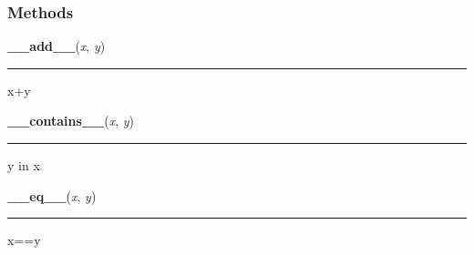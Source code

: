 
  \subsubsection{Methods}

    \label{posix:stat_result:__add__}

    \vspace{0.5ex}

\hspace{.8\funcindent}\begin{boxedminipage}{\funcwidth}

    \raggedright \textbf{\_\_add\_\_}(\textit{x}, \textit{y})

    \vspace{-1.5ex}

    \rule{\textwidth}{0.5\fboxrule}
\setlength{\parskip}{2ex}
    x+y

\setlength{\parskip}{1ex}
    \end{boxedminipage}

    \label{posix:stat_result:__contains__}

    \vspace{0.5ex}

\hspace{.8\funcindent}\begin{boxedminipage}{\funcwidth}

    \raggedright \textbf{\_\_contains\_\_}(\textit{x}, \textit{y})

    \vspace{-1.5ex}

    \rule{\textwidth}{0.5\fboxrule}
\setlength{\parskip}{2ex}
    y in x

\setlength{\parskip}{1ex}
    \end{boxedminipage}

    \label{posix:stat_result:__eq__}

    \vspace{0.5ex}

\hspace{.8\funcindent}\begin{boxedminipage}{\funcwidth}

    \raggedright \textbf{\_\_eq\_\_}(\textit{x}, \textit{y})

    \vspace{-1.5ex}

    \rule{\textwidth}{0.5\fboxrule}
\setlength{\parskip}{2ex}
    x==y

\setlength{\parskip}{1ex}
    \end{boxedminipage}

